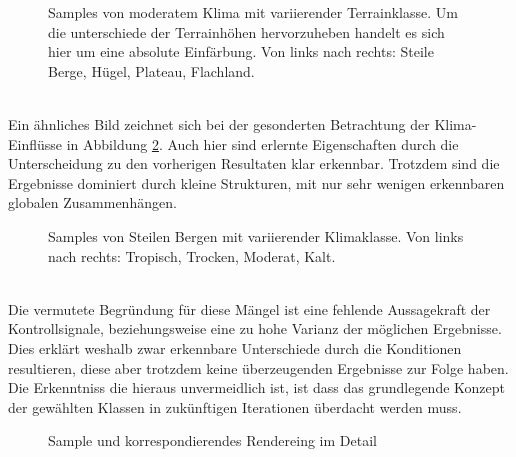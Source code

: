 \begin{figure}[htbp]
    \centering
    \caption{Samples von moderatem Klima mit variierender Terrainklasse. Um die unterschiede der Terrainhöhen hervorzuheben handelt es sich hier um eine absolute Einfärbung. Von links nach rechts: Steile Berge, Hügel, Plateau, Flachland.}
    \label{fig:unc_terrain}
\end{figure} \\
Ein ähnliches Bild zeichnet sich bei der gesonderten Betrachtung der Klima-Einflüsse in Abbildung \ref{fig:unc_climate}. Auch hier sind erlernte Eigenschaften durch die Unterscheidung zu den vorherigen Resultaten klar erkennbar. Trotzdem sind die Ergebnisse dominiert durch kleine Strukturen, mit nur sehr wenigen erkennbaren globalen Zusammenhängen.
\begin{figure}[htbp]
    \centering
    \caption{Samples von Steilen Bergen mit variierender Klimaklasse. Von links nach rechts: Tropisch, Trocken, Moderat, Kalt.}
    \label{fig:unc_climate}
\end{figure} \\
Die vermutete Begründung für diese Mängel ist eine fehlende Aussagekraft der Kontrollsignale, beziehungsweise eine zu hohe Varianz der möglichen Ergebnisse. Dies erklärt weshalb zwar erkennbare Unterschiede durch die Konditionen resultieren, diese aber trotzdem keine überzeugenden Ergebnisse zur Folge haben. Die Erkenntniss die hieraus unvermeidlich ist, ist dass das grundlegende Konzept der gewählten Klassen in zukünftigen Iterationen überdacht werden muss.  
\begin{figure}[htbp]
    \centering
    \caption{Sample und korrespondierendes Rendereing im Detail}
    \label{fig:unc_climate_renders}
\end{figure}


